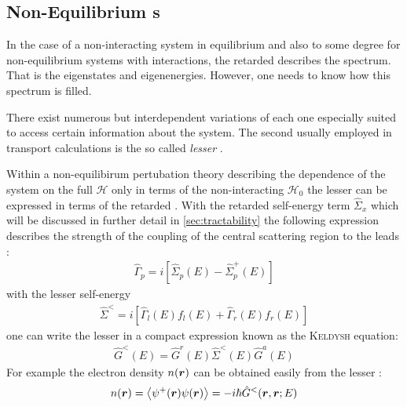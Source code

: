 \subsection{Non-Equilibrium \cgfnc s}
In the case of a non-interacting system in equilibrium and also to some degree for non-equilibrium systems with interactions, the retarded \gfnc{} describes the spectrum. That is the eigenstates and eigenenergies. However, one needs to know how this spectrum is filled.\par 
There exist numerous but interdependent variations of \gfnc{} each one especially suited to access certain information about the system.
The second \gfnc{} usually employed in transport calculations is the so called \emph{lesser \gfnc{}} \cite{haug2008quantum}.\par
Within a non-equilibirum pertubation theory describing the dependence of the system on the full \hamil{} $\mathcal{H}$ only in terms of the non-interacting \hamil{} $\mathcal{H}_0$ \cite{Jauho2006} the lesser \gfnc{} can be expressed in terms of the retarded \gfnc{}. With the retarded self-energy term $\hat{\Sigma}_x$ which will be discussed in further detail in \cref{sec:tractability} the following expression describes the strength of the coupling of the central scattering region to the leads \cite{datta2005quantum}:
\begin{align}
\hat{\Gamma}_p = i\left[\hat{\Sigma}_p(E)-\hat{\Sigma}_p^+(E)\right]
\end{align}
with the lesser self-energy
\begin{align}
\hat{\Sigma}^<=i\left[\hat{\Gamma}_l(E)f_l(E)+\hat{\Gamma}_r(E)f_r(E) \right]
\end{align}
one can write the lesser \gfnc{} in a compact expression known as the \textsc{Keldysh} equation:
\begin{align}
\hat{G}^<(E) = \hat{G}^r(E) \hat{\Sigma}^<(E) \hat{G}^a(E)
\label{eqn:keldyshequation}
\end{align}
For example the electron density  $n(\boldsymbol{r})$ can be obtained easily from the lesser \gfnc{}:
\begin{align}
	n(\boldsymbol{r}) = \left< \psi^+ (\boldsymbol{r}) \psi(\boldsymbol{r})\right> = -i\hbar \hat{G}^<(\boldsymbol{r},\boldsymbol{r};E)
	\label{eqn:edensfromgreensfnc}
\end{align}

